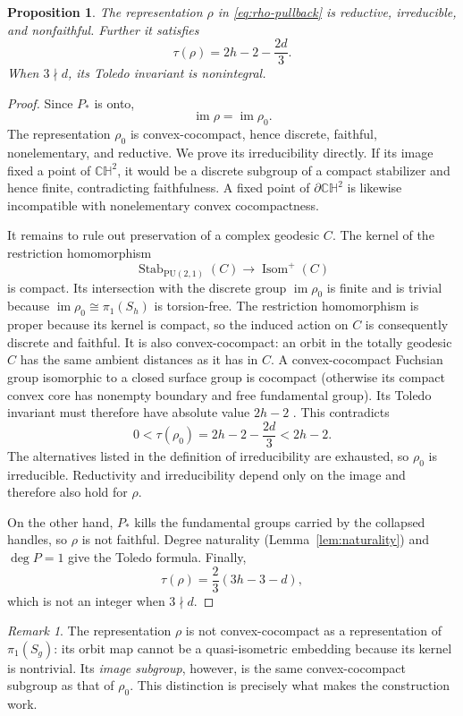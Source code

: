 \documentclass[12pt]{amsart}
\newtheorem{proposition}[theorem]{Proposition}
\theoremstyle{remark}
\newtheorem{remark}[theorem]{Remark}
\newcommand{\CH}{\mathbb{CH}}
\newcommand{\PU}{\mathrm{PU}}
\newcommand{\im}{\operatorname{im}}
\begin{document}
\begin{proposition}\label{prop:rho-properties}
The representation $\rho$ in \eqref{eq:rho-pullback} is reductive, irreducible, and nonfaithful. Further it satisfies
\[
 \tau(\rho)=2h-2-\frac{2d}{3}.
\]
When $3\nmid d$, its Toledo invariant is nonintegral.
\end{proposition}

\begin{proof}
Since $P_*$ is onto,
\[
 \im\rho=\im\rho_0.
\]
The representation $\rho_0$ is convex-cocompact, hence discrete, faithful,
nonelementary, and reductive.  We prove its irreducibility directly.  If its
image fixed a point of $\CH^2$, it would be a discrete subgroup of a compact
stabilizer and hence finite, contradicting faithfulness.  A fixed point of
$\partial\CH^2$ is likewise incompatible with nonelementary convex
cocompactness.

It remains to rule out preservation of a complex geodesic $C$.  The kernel of
the restriction homomorphism
\[
 \operatorname{Stab}_{\PU(2,1)}(C)
 \longrightarrow\operatorname{Isom}^+(C)
\]
is compact.  Its intersection with the discrete group $\im\rho_0$ is finite
and is trivial because $\im\rho_0\cong\pi_1(S_h)$ is torsion-free.  The
restriction homomorphism is proper because its kernel is compact, so the
induced action on $C$ is consequently discrete and faithful.  It is also
convex-cocompact: an orbit in the totally geodesic $C$ has the same ambient
distances as it has in $C$.  A convex-cocompact Fuchsian group isomorphic to
a closed surface group is cocompact (otherwise its compact convex core has
nonempty boundary and free fundamental group).  Its Toledo invariant must
therefore have absolute value $2h-2$ \cite{Toledo1989}.  This contradicts
\[
 0<\tau(\rho_0)=2h-2-\frac{2d}{3}<2h-2.
\]
The alternatives listed in the definition of irreducibility are exhausted,
so $\rho_0$ is irreducible.  Reductivity and irreducibility depend only on
the image and therefore also hold for $\rho$.

On the other hand, $P_*$ kills the fundamental groups carried by the collapsed
handles, so $\rho$ is not faithful.  Degree naturality
(Lemma~\ref{lem:naturality}) and $\deg P=1$ give the Toledo formula.  Finally,
\[
 \tau(\rho)=\frac23(3h-3-d),
\]
which is not an integer when $3\nmid d$.
\end{proof}

\begin{remark}
The representation $\rho$ is not convex-cocompact as a representation of
$\pi_1(S_g)$: its orbit map cannot be a quasi-isometric embedding because its
kernel is nontrivial.  Its \emph{image subgroup}, however, is the same
convex-cocompact subgroup as that of $\rho_0$.  This distinction is precisely
what makes the construction work.
\end{remark}
\end{document}
